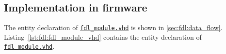 \clearpage

\subsection{Implementation in firmware}
\label{sec:fdl:implementation_firmware}

The entity declaration of \href{\gitbranch/firmware/hdl/payload/fdl_module.vhd}{\texttt{\textquotesingle fdl\_module.vhd\textquotesingle }} is shown in \ref{sec:fdl:data_flow}.\\

Listing~\ref{lst:fdl:fdl_module_vhd} contains the entity declaration of \href{\gitbranch/firmware/hdl/payload/fdl_module.vhd}{\texttt{\textquotesingle fdl\_module.vhd\textquotesingle }}.\\



